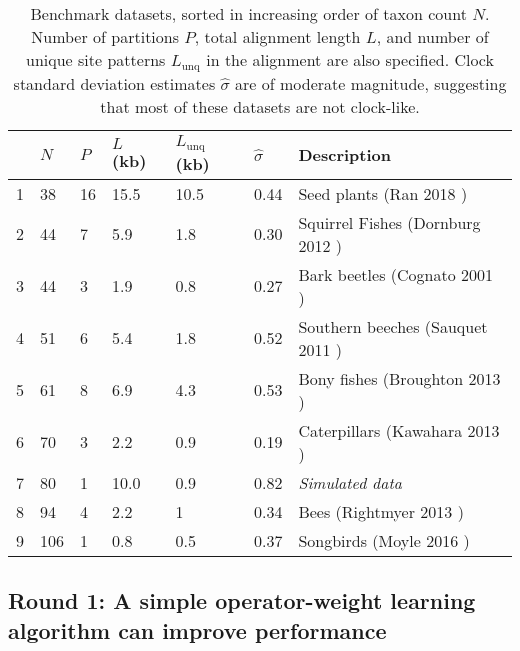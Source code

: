 \documentclass[10pt,letterpaper]{article}
\begin{document}
\begin{table}[h!]
\centering
\begin{tabular}{l l l l l l l} 
  & $N$ & $P$ & $L$ (kb) & $L_\text{unq}$ (kb) & $\hat{\sigma}$ & \textbf{Description} \\
  \hline
 
 
 1  &  38  &  16  &  15.5  &  10.5 &  0.44 &  Seed plants (Ran 2018 \cite{Ran_2018}) \\ 

2  &  44  &  7  &  5.9  &  1.8& 0.30 &  Squirrel Fishes (Dornburg 2012 \cite{Dornburg_2012}) \\ 

3  &  44  &  3  &  1.9  &  0.8& 0.27  &  Bark beetles (Cognato 2001 \cite{Cognato_2001}) \\ 

4  &  51  &  6  &  5.4  &  1.8 & 0.52 &  Southern beeches (Sauquet 2011 \cite{Sauquet_2011}) \\ 

5  &  61  &  8  &  6.9  &  4.3 & 0.53 &  Bony fishes (Broughton 2013 \cite{Broughton_2013}) \\ 

6  &  70  &  3  &  2.2  &  0.9  & 0.19 &  Caterpillars (Kawahara 2013 \cite{Kawahara_2013}) \\ 

7  &  80  &  1 &  10.0  &  0.9 & 0.82 &  \textit{Simulated data}  \\ 

8  &  94  &  4  &  2.2  &  1 & 0.34 &  Bees (Rightmyer 2013 \cite{Rightmyer_2013}) \\ 

9  &  106  &  1  &  0.8  &  0.5 & 0.37 &  Songbirds (Moyle 2016 \cite{Moyle_2016}) \\ 



\end{tabular}
\caption{Benchmark datasets, sorted in increasing order of taxon count $N$. Number of partitions $P$, total alignment length $L$, and number of unique site patterns $L_\text{unq}$ in the alignment are also specified.
Clock standard deviation estimates $\hat\sigma$ are of moderate magnitude, suggesting that most of these datasets are not clock-like.
}
\label{table:datasets}
\end{table}


\clearpage
\subsection*{Round 1: A simple operator-weight learning algorithm can improve performance}
\end{document}
